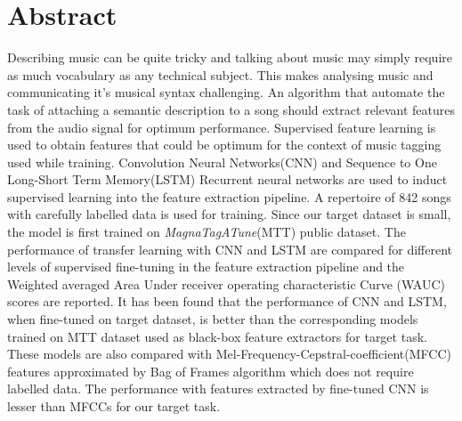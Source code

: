 \documentclass{book}
\begin{document}
\aicescoverpage


\section*{Abstract}

Describing music can be quite tricky and talking about music may simply require as much vocabulary as any technical subject. This makes analysing music and communicating it's musical syntax challenging. An algorithm that  automate the task of attaching a semantic description to a song should extract relevant features from the audio signal for optimum performance.
Supervised feature learning is used to obtain features that could be optimum for the context of music tagging used while training. Convolution Neural Networks(CNN) and Sequence to One Long-Short Term Memory(LSTM) Recurrent neural networks are used to induct supervised learning into the feature extraction pipeline. A repertoire of 842 songs with carefully labelled data is used for training. Since our target dataset is small, the model is first trained on \textit{MagnaTagATune}(MTT) public dataset. The performance of transfer learning with CNN and LSTM are compared for different levels of supervised fine-tuning in the feature extraction pipeline and the Weighted averaged Area Under receiver operating characteristic Curve (WAUC) scores are reported. It has been found that the performance of CNN and LSTM, when fine-tuned on target dataset, is better than the corresponding models trained on MTT dataset used as black-box feature extractors for target task. These models are also compared with Mel-Frequency-Cepstral-coefficient(MFCC) features approximated by Bag of Frames algorithm which does not require labelled data. The performance with features extracted by fine-tuned CNN is lesser than MFCCs for our target task.   
  
\end{document}
